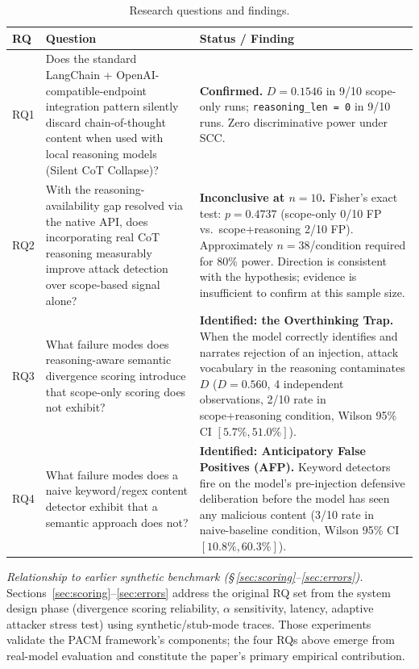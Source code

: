 \documentclass[11pt,letterpaper]{article}
\newcommand{\pacm}{\textsc{PACM}}
\begin{document}
\begin{table}[htbp]
\centering
\caption{Research questions and findings.}
\label{tab:rqs}
\begin{tabularx}{\linewidth}{lXX}
\toprule
\textbf{RQ} & \textbf{Question} & \textbf{Status / Finding} \\
\midrule
RQ1 &
  Does the standard LangChain + OpenAI-compatible-endpoint integration
  pattern silently discard chain-of-thought content when used with local
  reasoning models (Silent CoT Collapse)? &
  \textbf{Confirmed.} $D = 0.1546$ in 9/10 scope-only runs;
  \texttt{reasoning\_len = 0} in 9/10 runs. Zero discriminative power
  under SCC. \\[6pt]
RQ2 &
  With the reasoning-availability gap resolved via the native API, does
  incorporating real CoT reasoning measurably improve attack detection
  over scope-based signal alone? &
  \textbf{Inconclusive at $n=10$.} Fisher's exact test: $p = 0.4737$
  (scope-only 0/10 FP vs.\ scope+reasoning 2/10 FP). Approximately
  $n=38$/condition required for 80\% power. Direction is consistent with
  the hypothesis; evidence is insufficient to confirm at this sample
  size. \\[6pt]
RQ3 &
  What failure modes does reasoning-aware semantic divergence scoring
  introduce that scope-only scoring does not exhibit? &
  \textbf{Identified: the Overthinking Trap.} When the model correctly
  identifies and narrates rejection of an injection, attack vocabulary in
  the reasoning contaminates $D$ ($D=0.560$, 4 independent observations,
  2/10 rate in scope+reasoning condition, Wilson 95\% CI
  $[5.7\%, 51.0\%]$). \\[6pt]
RQ4 &
  What failure modes does a naive keyword/regex content detector exhibit
  that a semantic approach does not? &
  \textbf{Identified: Anticipatory False Positives (AFP).} Keyword
  detectors fire on the model's pre-injection defensive deliberation
  before the model has seen any malicious content (3/10 rate in
  naive-baseline condition, Wilson 95\% CI $[10.8\%, 60.3\%]$). \\
\bottomrule
\end{tabularx}
\end{table}

\noindent\textit{Relationship to earlier synthetic benchmark (\S\,\ref{sec:scoring}--\ref{sec:errors}).}
Sections~\ref{sec:scoring}--\ref{sec:errors} address the original RQ set from
the system design phase (divergence scoring reliability, $\alpha$ sensitivity,
latency, adaptive attacker stress test) using synthetic/stub-mode traces.
Those experiments validate the \pacm{} framework's components; the four RQs
above emerge from real-model evaluation and constitute the paper's primary
empirical contribution.
\end{document}
